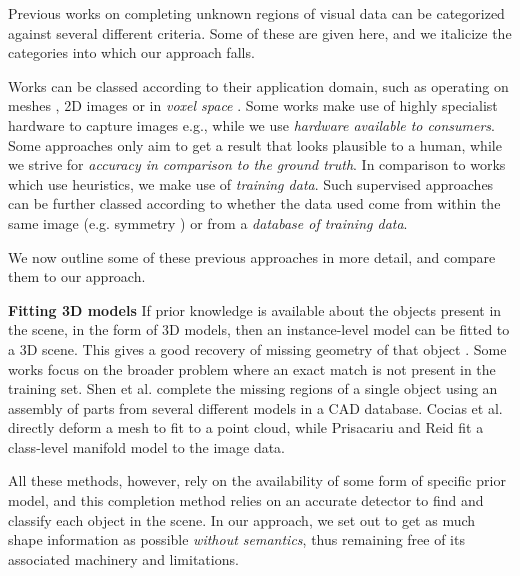 \documentclass[10pt,twocolumn,letterpaper]{article}
\makeatletter
\renewcommand*{\eg}{e.g.\@\xspace}
\newcommand*{\ea}{et al.\@\xspace}
\renewcommand{\paragraph}{\vspace{2pt}\noindent\textbf}
\makeatother
\begin{document}
Previous works on completing unknown regions of visual data can be categorized against several different criteria.
Some of these are given here, and we italicize the categories into which our approach falls.

Works can be classed according to their application domain, such as operating on meshes \cite{harary-tog-2013, schnabel-eurographics-2009}, 2D images \cite{gupta-cvpr-2011} or in \emph{voxel space} \cite{kim-iccv-2013}.
Some works make use of highly specialist hardware to capture images \eg \cite{velten-nature-2012}, while we use \emph{hardware available to consumers}.
Some approaches only aim to get a result that looks plausible to a human, while we strive for \emph{accuracy in comparison to the ground truth}.
In comparison to works which use heuristics, we make use of \emph{training data}.
Such supervised approaches can be further classed according to whether the data used come from within the same image (\eg symmetry \cite{kroemer-humanoids-2012}) or from a \emph{database of training data}.

We now outline some of these previous approaches in more detail, and compare them to our approach.


\paragraph{Fitting 3D models}
If prior knowledge is available about the objects present in the scene, in the form of 3D models, then an instance-level model can be fitted to a 3D scene.
This gives a good recovery of missing geometry of that object \cite{hinterstoisser-accv-2012, drost-3dimpvt-2012}.
Some works focus on the broader problem where an exact match is not present in the training set.
Shen \ea \cite{shen-tog-2012} complete the missing regions of a single object using an assembly of parts from several different models in a CAD database.
Cocias \ea \cite{cocias-cgvcv-2013} directly deform a mesh to fit to a point cloud, while Prisacariu and Reid \cite{prisacariu-iccv-2011} fit a class-level manifold model to the image data.

All these methods, however, rely on the availability of some form of specific prior model, and this completion method relies on an accurate detector to find and classify each object in the scene.
In our approach, we set out to get as much shape information as possible \emph{without semantics}, thus remaining free of its associated machinery and limitations.
\end{document}
